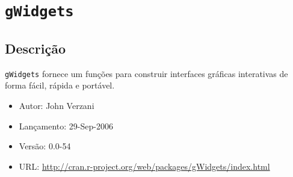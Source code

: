 \section{\texttt{gWidgets}}


\subsection{Descrição}

\begin{frame}

  \texttt{gWidgets} fornece um funções para construir interfaces
  gráficas interativas de forma fácil, rápida e portável.
  \vspace{2em}

  \begin{itemize}
  \item Autor: John Verzani
  \item Lançamento: 29-Sep-2006
  \item Versão: 0.0-54
  \item URL: \url{http://cran.r-project.org/web/packages/gWidgets/index.html}
  \end{itemize}

\end{frame}

\begin{center}
\end{center}

